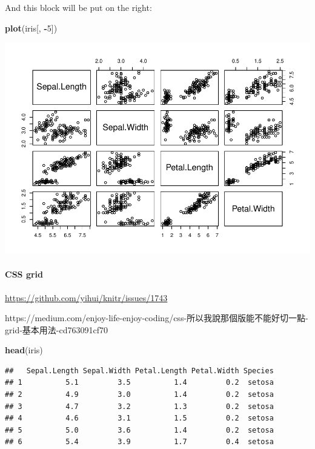 \documentclass[
]{book}
\newenvironment{Shaded}{\begin{snugshade}}{\end{snugshade}}
\newcommand{\DecValTok}[1]{\textcolor[rgb]{0.00,0.00,0.81}{#1}}
\newcommand{\FunctionTok}[1]{\textcolor[rgb]{0.13,0.29,0.53}{\textbf{#1}}}
\newcommand{\NormalTok}[1]{#1}
\newcommand{\SpecialCharTok}[1]{\textcolor[rgb]{0.81,0.36,0.00}{\textbf{#1}}}
\theoremstyle{definition}
\theoremstyle{definition}
\theoremstyle{definition}
\theoremstyle{definition}
\theoremstyle{remark}
\begin{document}
And this block will be put on the right:

\begin{Shaded}
\begin{Highlighting}[]
\FunctionTok{plot}\NormalTok{(iris[, }\SpecialCharTok{{-}}\DecValTok{5}\NormalTok{])}
\end{Highlighting}
\end{Shaded}

\includegraphics{202401280001-test_files/figure-latex/unnamed-chunk-39-1.pdf}

\hypertarget{css-grid}{%
\paragraph{CSS grid}\label{css-grid}}

\url{https://github.com/yihui/knitr/issues/1743}

\begin{CJK}{UTF8}{bsmi}
https://medium.com/enjoy-life-enjoy-coding/css-所以我說那個版能不能好切一點-grid-基本用法-cd763091cf70
\end{CJK}

\begin{Shaded}
\begin{Highlighting}[]
\FunctionTok{head}\NormalTok{(iris)}
\end{Highlighting}
\end{Shaded}

\begin{verbatim}
##   Sepal.Length Sepal.Width Petal.Length Petal.Width Species
## 1          5.1         3.5          1.4         0.2  setosa
## 2          4.9         3.0          1.4         0.2  setosa
## 3          4.7         3.2          1.3         0.2  setosa
## 4          4.6         3.1          1.5         0.2  setosa
## 5          5.0         3.6          1.4         0.2  setosa
## 6          5.4         3.9          1.7         0.4  setosa
\end{verbatim}
\end{document}
